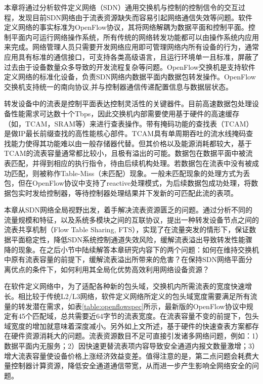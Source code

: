 
\label{chap5}


\label{chap51}

本章将通过分析软件定义网络（SDN）通用交换机与控制的控制信令的交互过程，发现目前SDN网络由于流表资源缺失而容易引起网络通信失效等问题。软件定义网络的事实标准为OpenFlow协议，其将网络解耦为数据平面和控制平面。控制平面内可运行网络操作系统，所有传统的网络转发功能都可以由操作系统内应用来完成。网络管理人员只需要开发网络应用即可管理网络内所有设备的行为，通常应用具有标准的通信接口，可支持各类高级语言，且运行环境单一且标准，屏蔽了过去由于设备数量众多导致的开发流程复杂等问题。OpenFlow交换机是支持软件定义网络的标准化设备，负责SDN网络内数据平面内数据包转发操作。OpenFlow交换机支持统一的南向协议,并与控制器通信传递配置信息与数据层状态。

转发设备中的流表是控制平面表达控制灵活性的关键器件。目前高速数据包处理设备性能需求可达数十个Tbps，因此交换机内部需要使用基于硬件的高速缓存（如，TCAM，SRAM等）来进行查表操作。带有掩码功能的查找表（TCAM）是做IP最长前缀查找的高性能核心部件。TCAM具有单周期吞吐的流水线掩码查找能力使得其功能难以由一般存储器代替。但其价格以及能源消耗都较大，基于TCAM的流表容量通常都比较小，且极有溢出的可能。数据包在数据平面中被流表匹配，并得到相应的执行指令，待由后续机构处理。若数据包在流表中没有被成功匹配，则被称作Table-Miss（未匹配）现象。一般未匹配现象的处理方式为丢包，但在OpenFlow协议中支持了reactive处理模式，为后续数据包成功处理，将数据包实时发给控制器，等待控制器处理结果并下发新的可匹配此流的表项。

本章从SDN网络全局视野出发，着手解决流表资源匮乏的问题。通过分析不同的流量规模和特征，以及系统多模块之间的互联协议，提出一种转发设备节点之间的流表共享机制（Flow Table Sharing, FTS），实现了在流量突发的情形下，保证数据平面稳定性，降低SDN系统控制通道失效风险，缓解流表溢出导致转发性能骤降的现象。在之后小节中陆续解答本章研究内容下的两个问题：如何在维持交换机中原有流表容量的前提下，缓解流表溢出所带来的危害？在保持SDN网络平面分离优点的条件下，如何利用其全局化优势高效利用网络设备资源？




在软件定义网络中，为了适配各种新的包头域，交换机内所需流表的宽度快速增长。相比较于传统L2/L3网络，软件定义网络所定义的包头域宽度需要满足所有流量的转发潜在需求，如表\ref{table:openflowspec}所示，最新版的OpenFlow协议中规定有45个匹配域，总共需要近64字节的流表宽度。在流表容量不变的前提下，包头域宽度的增加就意味着深度减小。另外如上文所述，基于硬件的快速查表方案都存在硬件资源消耗大的问题。流表资源数目不足可直接引发诸多网络问题，例如：1）数据平面内无服务；2）因快速更替流表项内容导致安全通道内报文数量激增；3）增大流表容量使设备价格上涨经济效益变差。值得注意的是，第二点问题会耗费大量控制器计算资源，降低安全通道通信带宽，从而进一步产生影响全网络安全的问题。


